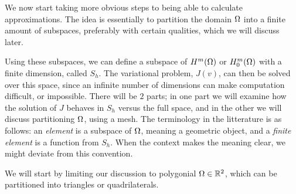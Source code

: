 We now start taking more obvious steps to being able to calculate approximations. 
The idea is essentially to partition the domain $\Omega$ into a finite amount 
of subspaces, preferably with certain qualities, which we will discuss later. 

Using these subspaces, we can define a subspace of $H^m(\Omega)$ or $H^m_0(\Omega)$ 
with a finite dimension, called $S_h$. The variational problem, $J(v)$, can then be 
solved over this space, since an infinite number of dimensions can make 
computation difficult, or impossible. There will be $2$ parts; in one part we 
will examine how the solution of $J$ behaves in $S_h$ versus the full space, 
and in the other we will discuss partitioning $\Omega$, using a mesh.
The terminology in the litterature is as follows: an \emph{element} is a 
subspace of $\Omega$, meaning a geometric object, and a \emph{finite element} is a 
function from $S_h$. When the context makes the meaning clear, we might deviate from 
this convention.

We will start by limiting our discussion to polygonial $\Omega \in \mathbb{R}^2$, which 
can be partitioned into triangles or quadrilaterals.